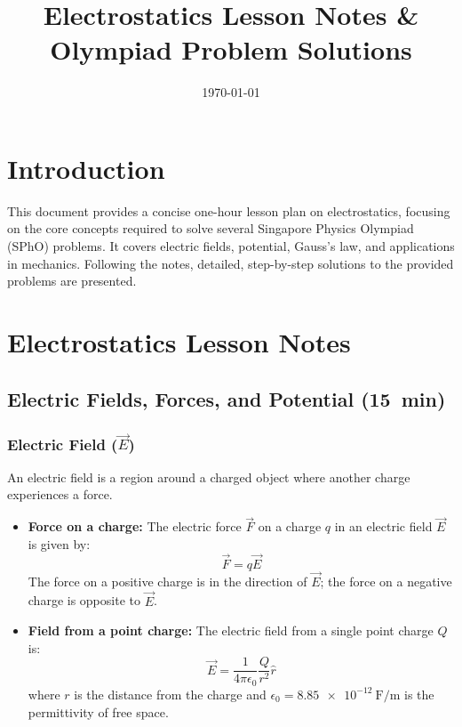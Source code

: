 \documentclass{article}
\title{Electrostatics Lesson Notes \& Olympiad Problem Solutions}
\author{}
\date{\today}
\numberwithin{equation}{section}
\begin{document}
\maketitle

\section*{Introduction}
This document provides a concise one-hour lesson plan on electrostatics, focusing on the core concepts required to solve several Singapore Physics Olympiad (SPhO) problems. It covers electric fields, potential, Gauss's law, and applications in mechanics. Following the notes, detailed, step-by-step solutions to the provided problems are presented.

\section{Electrostatics Lesson Notes}

\subsection{Electric Fields, Forces, and Potential (\SI{15}{min})}

\subsubsection{Electric Field ($\vec{E}$)}
An electric field is a region around a charged object where another charge experiences a force.
\begin{itemize}
    \item \textbf{Force on a charge:} The electric force $\vec{F}$ on a charge $q$ in an electric field $\vec{E}$ is given by:
    $$ \vec{F} = q\vec{E} $$
    The force on a positive charge is in the direction of $\vec{E}$; the force on a negative charge is opposite to $\vec{E}$.

    \item \textbf{Field from a point charge:} The electric field from a single point charge $Q$ is:
    $$ \vec{E} = \frac{1}{4\pi\epsilon_0} \frac{Q}{r^2} \hat{r} $$
    where $r$ is the distance from the charge and $\epsilon_0 = \SI{8.85e-12}{\farad\per\meter}$ is the permittivity of free space.
\end{itemize}
\end{document}
